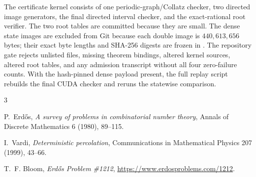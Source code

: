 \documentclass[11pt]{article}
\theoremstyle{definition}
\theoremstyle{remark}
\begin{document}
The certificate kernel consists of one periodic-graph/Collatz checker, two
directed image generators, the final directed interval checker, and the
exact-rational root verifier.  The two root tables are committed because they
are small.  The dense state images are excluded from Git because each double
image is $440{,}613{,}656$ bytes; their exact byte lengths and SHA-256 digests
are frozen in .  The repository gate rejects
unlisted files, missing theorem bindings, altered kernel sources, altered root
tables, and any admission transcript without all four zero-failure counts.
With the hash-pinned dense payload present, the full replay script rebuilds
the final CUDA checker and reruns the statewise comparison.

\begin{thebibliography}{3}

P.~Erd\H{o}s,
\emph{A survey of problems in combinatorial number theory},
Annals of Discrete Mathematics 6 (1980), 89--115.

I.~Vardi,
\emph{Deterministic percolation},
Communications in Mathematical Physics 207 (1999), 43--66.

T.~F. Bloom,
\emph{Erd\H{o}s Problem \#1212},
\url{https://www.erdosproblems.com/1212}.

\end{thebibliography}
\end{document}
